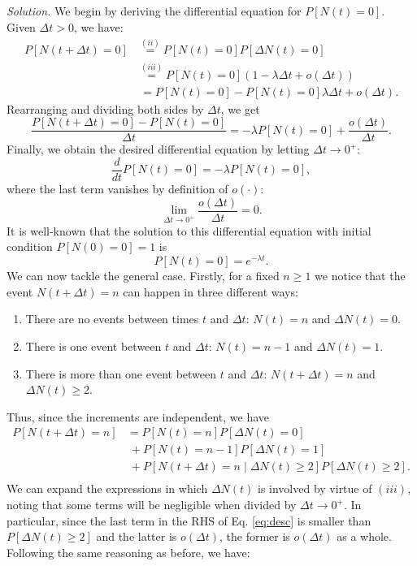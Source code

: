 \emph{Solution. }We begin by deriving the differential equation for \( P[N(t) = 0]\). Given $\Delta t > 0$, we have:
\[
  \begin{aligned}
    P[N(t + \Delta t) = 0] &\stackrel{(ii)}{=} P[N(t) = 0]P[\Delta N(t) = 0]\\
    &\stackrel{(iii)}{=} P[N(t) = 0](1- \lambda\Delta t + o(\Delta t))\\
    &\ = P[N(t) = 0] - P[N(t) = 0]\lambda\Delta t + o(\Delta t).
    \end{aligned}
  \]
  Rearranging and dividing both sides by \( \Delta t \), we get
  \[
    \frac{P[N(t + \Delta t) = 0] - P[N(t) = 0]}{\Delta t} = - \lambda P[N(t) = 0] + \frac{o(\Delta t)}{\Delta t}.
  \]
  Finally, we obtain the desired differential equation by letting $\Delta t \to 0^+$:
\[
  \frac{d}{dt}P[N(t) = 0] = -\lambda P[N(t) = 0],
\]
where the last term vanishes by definition of \( o(\cdot) \):
  \[
    \lim_{\Delta t \to 0^{+}}\frac{o(\Delta t)}{\Delta t} = 0.
  \]
It is well-known that the solution to this differential equation with initial condition \( P[N(0) = 0] = 1 \) is
\[
  P[N(t) = 0] = e^{-\lambda t}.
\]
We can now tackle the general case. Firstly, for a fixed \( n \geq 1 \) we notice that the event \(  N(t + \Delta t) = n \) can happen in three different ways:
\begin{enumerate}
  \item There are no events between times $t$ and \( \Delta t \): \(  N(t) = n \) and \(\Delta N(t) = 0\).
  \item There is one event between $t$ and \( \Delta t \): \(N(t) = n-1\) and \(\Delta N(t) = 1 \).
\item There is more than one event between $t$ and \( \Delta t \): \(  N(t + \Delta t) = n \) and \(\Delta N(t)  \geq 2\).
\end{enumerate}
Thus, since the increments are independent, we have
\begin{equation}
  \label{eq:desc}
  \begin{aligned}
    P[N(t + \Delta t) = n] &= P[N(t) = n]P[\Delta N(t) = 0]\\
    &\ + P[N(t) = n-1]P[\Delta N(t) = 1] \\
    &\ + P[N(t+\Delta t)=n \mid \Delta N(t)\geq 2]P[\Delta N(t)\geq 2].\\
    \end{aligned}
  \end{equation}
  We can expand the expressions in which $\Delta N(t)$ is involved by virtue of $(iii)$, noting that some terms will be negligible when divided by $\Delta t \to 0^+$. In particular, since the last term in the RHS of Eq. \eqref{eq:desc} is smaller than $P[\Delta N(t)\geq 2]$ and the latter is $o(\Delta t)$, the former is $o(\Delta t)$ as a whole. Following the same reasoning as before, we have:
